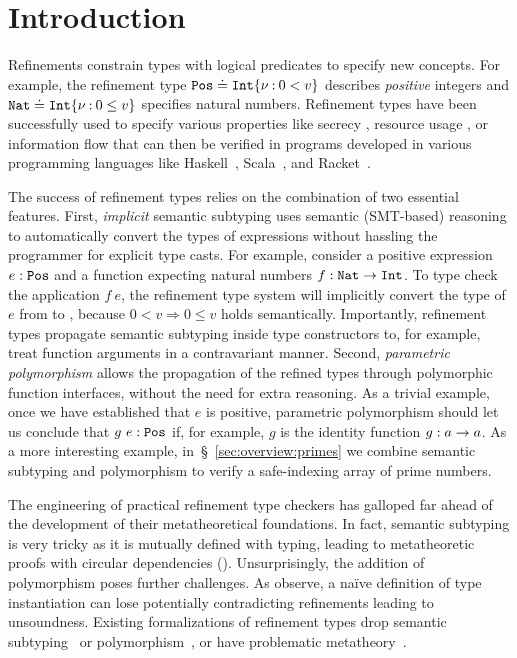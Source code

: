 \chapter{Introduction}
\label{ch:intro}

Refinements constrain types with logical predicates
to specify new concepts.
%
For example, the refinement type
$\texttt{Pos} \doteq {\ensuremath{{\texttt{Int}}\{\nu \mathbin{:} 0 < v\}}}$
describes \emph{positive} integers
and $\texttt{Nat} \doteq {\ensuremath{{\texttt{Int}}\{\nu \mathbin{:} 0 \leq v\}}}$
specifies natural numbers.
%
Refinement types have been successfully
used to specify various properties
like secrecy \citep{FournetCCS11},
resource usage \citep{Knoth20}, or
information flow \citep{STORM}
that can then be verified in programs
developed in various programming
languages like Haskell~\citep{Vazou14},
Scala~\citep{kuncak-stainless}, and
Racket~\citep{RefinedRacket}.

%
The success of refinement types
relies on the combination of two
essential features.
%
First, \textit{implicit} semantic
subtyping uses semantic (SMT-based)
reasoning to automatically convert
the types of expressions without
hassling the programmer for explicit type
casts.
%
For example, consider a positive expression
$e : \texttt{Pos}$ and a function expecting natural
numbers $f:\texttt{Nat} \rightarrow \texttt{Int}$.
%
To type check the application $f\ e$,
the refinement type system will implicitly
convert the type of $e$ from \tpos to \tnat,
because $0 < v \Rightarrow 0 \leq v$
holds semantically.
%
Importantly, refinement types propagate
semantic subtyping inside type constructors
to, for example, treat function arguments in
a contravariant manner.
%
Second, \textit{parametric polymorphism}
allows the propagation of the refined types
through polymorphic function interfaces,
without the need for extra reasoning.
%
As a trivial example, once we have
established that $e$ is positive,
parametric polymorphism should let
us conclude that $g\ e : \texttt{Pos}$ if,
for example, $g$ is the identity function
$g:a \rightarrow a$.
As a more interesting example, in~\S~\ref{sec:overview:primes}     %
we combine semantic subtyping and polymorphism
to verify a safe-indexing array of prime numbers.

The engineering of practical refinement
type checkers has galloped far ahead of
the development of their metatheoretical
foundations.
%
In fact, semantic subtyping is very tricky
as it is mutually defined with typing,
leading to metatheoretic proofs with
circular dependencies ().
%
Unsurprisingly, the addition of polymorphism
poses further challenges.
%
As \citet{SekiyamaIG17} observe, a na\"ive definition
of type instantiation can lose potentially contradicting
refinements leading to unsoundness.
%
Existing formalizations of refinement types
drop semantic subtyping~\citep{SekiyamaIG17,kuncak-stainless}
or polymorphism~\citep{flanagan06, newfstar},
or have problematic metatheory~\citep{Belo11}.


